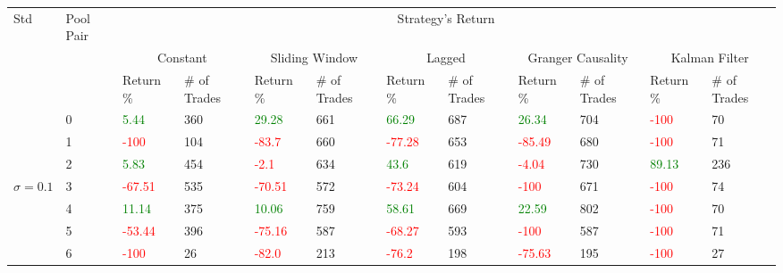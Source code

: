 \begin{table}[!htb]
    \centering
    \begin{adjustwidth}{-0.8in}{-0.9in}
        \begin{tabular}{|p{4em}|p{2em}|p{3em}|p{3em}|p{3em}|p{3em}|p{3em}|p{3em}|p{3em}|p{3em}|p{3em}|p{3em}|}\hline
            Std & Pool Pair & \multicolumn{10}{|c|}{Strategy's Return} \\\cline{3-12}
            &   & \multicolumn{2}{|c|}{Constant} & \multicolumn{2}{|c|}{Sliding Window} & \multicolumn{2}{|c|}{Lagged} & \multicolumn{2}{|c|}{Granger Causality} & \multicolumn{2}{|c|}{Kalman Filter}\\\cline{3-12}
            & & Return \% & \# of Trades & Return \% & \# of Trades & Return \% & \# of Trades & Return \% & \# of Trades & Return \% & \# of Trades\\\hline

            & 0 & \textcolor{green}{5.44} & 360 & \textcolor{green}{29.28} & 661 & \textcolor{green}{66.29} & 687 & \textcolor{green}{26.34} & 704 & \textcolor{red}{-100} & 70\\\cline{3-12}
            & 1 & \textcolor{red}{-100} & 104 & \textcolor{red}{-83.7} & 660 & \textcolor{red}{-77.28} & 653 & \textcolor{red}{-85.49} & 680 & \textcolor{red}{-100} & 71\\\cline{3-12}
            & 2 & \textcolor{green}{5.83} & 454 & \textcolor{red}{-2.1} & 634 & \textcolor{green}{43.6} & 619 & \textcolor{red}{-4.04} & 730 & \textcolor{green}{89.13} & 236\\\cline{3-12}
            $\sigma=0.1$& 3 & \textcolor{red}{-67.51} & 535 & \textcolor{red}{-70.51} & 572 & \textcolor{red}{-73.24} & 604 & \textcolor{red}{-100} & 671 & \textcolor{red}{-100} & 74\\\cline{3-12}
            & 4 & \textcolor{green}{11.14} & 375 & \textcolor{green}{10.06} & 759 & \textcolor{green}{58.61} & 669 & \textcolor{green}{22.59} & 802 & \textcolor{red}{-100} & 70\\\cline{3-12}
            & 5 & \textcolor{red}{-53.44} & 396 & \textcolor{red}{-75.16} & 587 & \textcolor{red}{-68.27} & 593 & \textcolor{red}{-100} & 587 & \textcolor{red}{-100} & 71\\\cline{3-12}
            & 6 & \textcolor{red}{-100} & 26 & \textcolor{red}{-82.0} & 213 & \textcolor{red}{-76.2} & 198 & \textcolor{red}{-75.63} & 195 & \textcolor{red}{-100} & 27\\\hline\hline


\end{tabular}
\end{adjustwidth}
\end{table}
